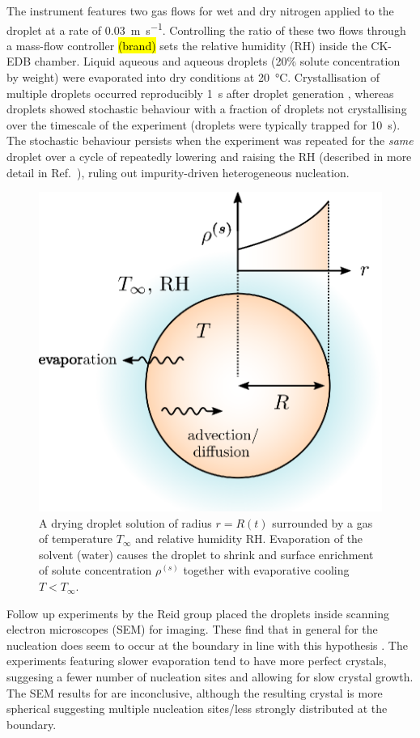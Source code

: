 \documentclass[11pt,twoside]{report}
\begin{document}
The instrument features two gas flows for wet and dry nitrogen applied to the droplet at a rate of \SI{0.03}{\metre\per\second}.
Controlling the ratio of these two flows through a mass-flow controller \hl{(brand)} sets the relative humidity (RH) inside the CK-EDB chamber.
Liquid aqueous  and aqueous  droplets (20\% solute concentration by weight) were evaporated into dry conditions at \SI{20}{\celsius}.
Crystallisation of multiple  droplets occurred reproducibly \SI{1}{\second} after droplet generation \cite{GregsonJPCB2019}, whereas  droplets showed stochastic behaviour with a fraction of droplets not crystallising over the timescale of the experiment (droplets were typically trapped for \SI{10}{\second}).
The stochastic behaviour persists when the experiment was repeated for the \emph{same}  droplet over a cycle of repeatedly lowering and raising the RH (described in more detail in Ref.\ \cite{GregsonTBD2019}), ruling out impurity-driven heterogeneous nucleation.

\begin{figure}
  \includegraphics[width=0.75\linewidth,outer]{aerosol-droplet}
  \caption[Model drying aerosol droplet]{
    A drying droplet solution of radius $r=R(t)$ surrounded by a gas of temperature $T_\infty$ and relative humidity RH.
    Evaporation of the solvent (water) causes the droplet to shrink and surface enrichment of solute concentration $\rho^{(s)}$ together with evaporative cooling $T < T_\infty$.}
  \label{fig:aerosol-droplet}
\end{figure}

Follow up experiments by the Reid group placed the droplets inside scanning electron microscopes (SEM) for imaging.
These find that in general for  the nucleation does seem to occur at the boundary in line with this hypothesis%
.
The experiments featuring slower evaporation tend to have more perfect crystals, suggesing a fewer number of nucleation sites and allowing for slow crystal growth.
The SEM results for  are inconclusive, although the resulting crystal is more spherical suggesting multiple nucleation sites/less strongly distributed at the boundary.
\end{document}
